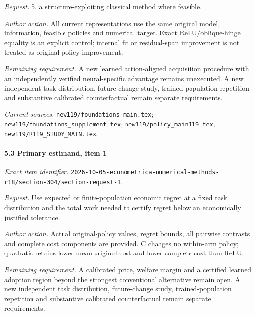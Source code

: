 \par\emph{Request.} 5. a structure-exploiting classical method where feasible.

\par\emph{Author action.} All current representations use the same original model, information, feasible policies and numerical target. Exact ReLU/\allowbreak{}oblique-hinge equality is an explicit control; internal fit or residual-span improvement is not treated as original-policy improvement.

\par\emph{Remaining requirement.} A new learned action-aligned acquisition procedure with an independently verified neural-specific advantage remains unexecuted. A new independent task distribution, future-change study, trained-population repetition and substantive calibrated counterfactual remain separate requirements.

\par\emph{Current sources.} \nolinkurl{new119/foundations_main.tex}; \nolinkurl{new119/foundations_supplement.tex}; \nolinkurl{new119/policy_main119.tex}; \nolinkurl{new119/R119_STUDY_MAIN.tex}.

\paragraph{5.3 Primary estimand, item 1}

\emph{Exact item identifier.} \nolinkurl{2026-10-05-econometrica-numerical-methods-r18/section-304/section-request-1}.

\par\emph{Request.} Use expected or finite-population economic regret at a fixed task distribution and the total work needed to certify regret below an economically justified tolerance.

\par\emph{Author action.} Actual original-policy values, regret bounds, all pairwise contrasts and complete cost components are provided. C changes no within-arm policy; quadratic retains lower mean original cost and lower complete cost than ReLU.

\par\emph{Remaining requirement.} A calibrated price, welfare margin and a certified learned adoption region beyond the strongest conventional alternative remain open. A new independent task distribution, future-change study, trained-population repetition and substantive calibrated counterfactual remain separate requirements.


